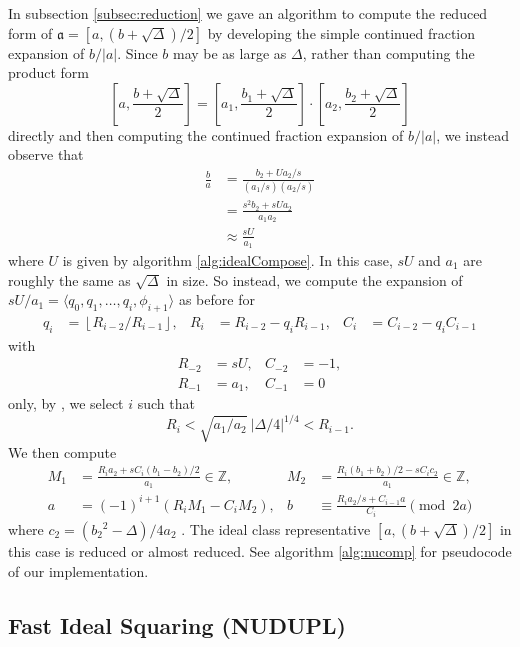 \documentclass{ucalgthes1}
\theoremstyle{plain}
\theoremstyle{definition}
\newcommand{\ZZ}{\mathbb{Z}}
\newcommand{\floor}[1]{\left\lfloor #1 \right\rfloor}
\begin{document}
In subsection \ref{subsec:reduction} we gave an algorithm to compute the reduced form of \break$\mathfrak a = [a, (b+\sqrt\Delta)/2]$ by developing the simple continued fraction expansion of $b/|a|$.  Since $b$ may be as large as $\Delta$, rather than computing the product form
\[
	\left[a, \frac{b+\sqrt\Delta}{2} \right] = \left[a_1, \frac{b_1+\sqrt\Delta}{2} \right] \cdot \left[a_2, \frac{b_2+\sqrt\Delta}{2} \right]
\]
directly and then computing the continued fraction expansion of $b/|a|$, we instead observe that
\begin{align*}
	\frac{b}{a} &= \frac{b_2 + Ua_2/s}{(a_1/s)(a_2/s)} \\
	&= \frac{s^2 b_2+sUa_2}{a_1a_2} \\
	&\approx \frac{sU}{a_1}
\end{align*}
where $U$ is given by algorithm \ref{alg:idealCompose}.  In this case, $sU$ and $a_1$ are roughly the same as $\sqrt\Delta$ in size.  So instead, we compute the expansion of $sU/a_1 = \langle q_0, q_1, \dots, q_i, \phi_{i+1} \rangle$ as before for
\begin{align*}
	q_i &= \floor{R_{i-2} / R_{i-1}}, &
	R_i &= R_{i-2} - q_i R_{i-1}, &
	C_i &= C_{i-2} - q_i C_{i-1}
\end{align*}
with
\begin{align*}
	R_{-2} &= sU,  & C_{-2} &= -1, \\
	R_{-1} &= a_1, & C_{-1} &= 0
\end{align*}
only, by \cite[Theorem 5.43]{Jac09}, we select $i$ such that
\[
	R_i < \sqrt{a_1/a_2} ~ |\Delta/4|^{1/4} < R_{i-1}.
\]
We then compute
\begin{align*}
	M_1 &= \frac{R_i a_2 + sC_i(b_1-b_2)/2}{a_1}  \in \ZZ, &
	M_2 &= \frac{R_i (b_1+b_2)/2 - s C_i c_2}{a_1} \in \ZZ, \\
	a &= (-1)^{i+1} (R_i M_1  - C_i M_2), &
	b &\equiv \frac{R_i a_2 /s + C_{i-1} a}{C_i} \pmod{2a}
\end{align*}
where $c_2 = ({b_2}^2-\Delta)/4a_2$ \cite[Equation 5.44]{Jac09}.  The ideal class representative $[a, (b+\sqrt\Delta)/2]$ in this case is reduced or almost reduced.  See algorithm \ref{alg:nucomp} for pseudocode of our implementation.


\subsection{Fast Ideal Squaring (NUDUPL)}\label{subsec:nudupl}
\end{document}
